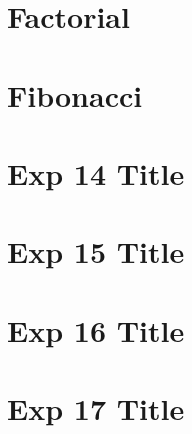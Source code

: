 \documentclass[12pt]{report}
\begin{document}
  \chapter{Factorial}
  
  
  \chapter{Fibonacci}
  
  
  \chapter{Exp 14 Title}
  
  
  \chapter{Exp 15 Title}
  
  
  \chapter{Exp 16 Title}
  
  
  \chapter{Exp 17 Title}
  
 
  
\end{document}
